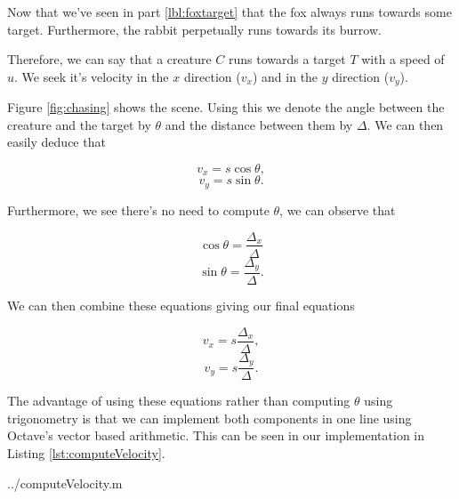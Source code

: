 Now that we've seen in part \ref{lbl:foxtarget} that the fox always runs towards some target. Furthermore, the rabbit perpetually runs towards its burrow. 

Therefore, we can say that a creature $C$ runs towards a target $T$ with a speed of $u$. We seek it's velocity in the $x$ direction ($v_x$) and in the $y$ direction ($v_y$).





Figure \ref{fig:chasing} shows the scene. Using this we denote the angle between the creature and the target by $\theta$ and the distance between them by $\Delta$. We can then easily deduce that

$$ v_x = s\cos{\theta}, $$
$$ v_y = s\sin{\theta}. $$

Furthermore, we see there's no need to compute $\theta$, we can observe that 

$$ \cos{\theta} = \frac{\Delta_x}{\Delta}$$
$$ \sin{\theta} = \frac{\Delta_y}{\Delta}.$$

We can then combine these equations giving our final equations

$$ v_x = s \frac{\Delta_x}{\Delta},$$
$$ v_y = s \frac{\Delta_y}{\Delta}.$$

The advantage of using these equations rather than computing $\theta$ using trigonometry is that we can implement both components in one line using Octave's vector based arithmetic. This can be seen in our implementation in Listing \ref{lst:computeVelocity}.

  {../computeVelocity.m}
